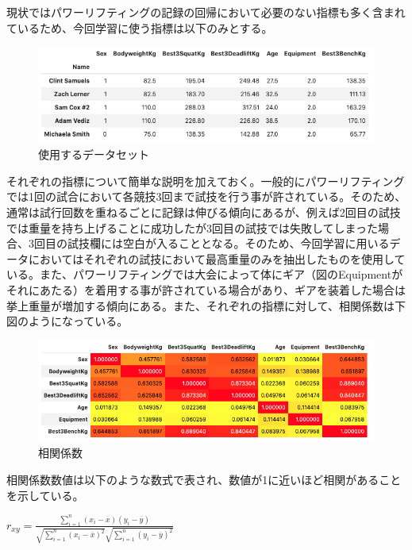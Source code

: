 \documentclass{article}
\begin{document}
現状ではパワーリフティングの記録の回帰において必要のない指標も多く含まれているため、今回学習に使う指標は以下のみとする。

\begin{figure}[H]
\begin{center}
\includegraphics[width=\linewidth]{data_trimed.png}
\caption{使用するデータセット}
\end{center}
\end{figure}

それぞれの指標について簡単な説明を加えておく。一般的にパワーリフティングでは1回の試合において各競技3回まで試技を行う事が許されている。そのため、通常は試行回数を重ねるごとに記録は伸びる傾向にあるが、例えば2回目の試技では重量を持ち上げることに成功したが3回目の試技では失敗してしまった場合、3回目の試技欄には空白が入ることとなる。そのため、今回学習に用いるデータにおいてはそれぞれの試技において最高重量のみを抽出したものを使用している。また、パワーリフティングでは大会によって体にギア（図のEquipmentがそれにあたる）を着用する事が許されている場合があり、ギアを装着した場合は挙上重量が増加する傾向にある。また、それぞれの指標に対して、相関係数は下図のようになっている。

\begin{figure}[H]
\begin{center}
\includegraphics[width=\linewidth]{corr.png}
\caption{相関係数}
\end{center}
\end{figure}

相関係数数値は以下のような数式で表され、数値が1に近いほど相関があることを示している。

\begin{center}
\begin{math}
r_{xy} = \frac{\displaystyle \sum_{i = 1}^n (x_i - \overline{x})
(y_i - \overline{y})}{\sqrt{\displaystyle \sum_{i = 1}^n 
(x_i - \overline{x})^2}\sqrt{\displaystyle \sum_{i = 1}^n 
(y_i - \overline{y})^2}}
\end{math}
\end{center}
\end{document}

